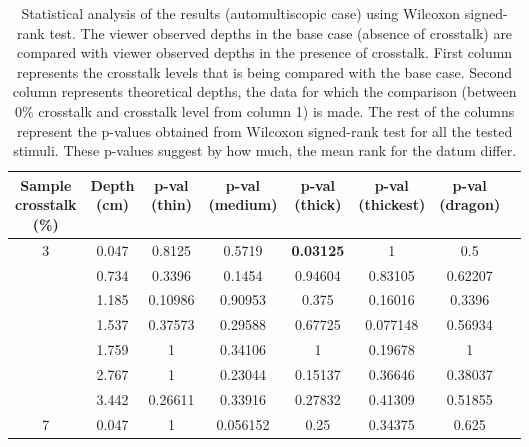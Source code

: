 \begin{table}[H]
  \begin{center}
    \caption{Statistical analysis of the results (automultiscopic case) using Wilcoxon signed-rank test. The viewer observed depths in the base case (absence of crosstalk) are compared with viewer observed depths in the presence of crosstalk. First column  represents the crosstalk levels that is being compared with the base case. Second column represents theoretical depths, the data for which the comparison (between 0\% crosstalk and crosstalk level from column 1) is made. The rest of the columns represent the p-values obtained from Wilcoxon signed-rank test for all the tested stimuli. These p-values suggest by how much, the mean rank for the datum differ.}
    \label{tab:posthoc_auto}
    \begin{tabular}{cccccccc}
      \toprule
      \specialcell{Sample\\crosstalk\\(\%)} & \specialcell{Depth \\(cm)} & \specialcell{p-val \\(thin)} & \specialcell{p-val \\(medium)} & \specialcell{p-val \\(thick)} & \specialcell{p-val \\(thickest)} & \specialcell{p-val \\(dragon)}\\
      \midrule
   3&          0.047&          0.8125&          0.5719&          \textbf{0.03125}&          1&          0.5 \\
    &          0.734&          0.3396&          0.1454&          0.94604&          0.83105&          0.62207 \\
    &          1.185&          0.10986&          0.90953&          0.375&          0.16016&          0.3396 \\
    &          1.537&          0.37573&          0.29588&          0.67725&          0.077148&          0.56934 \\
    &          1.759&          1    &          0.34106&          1&          0.19678&          1 \\
    &          2.767&          1    &          0.23044&          0.15137&          0.36646&          0.38037 \\
    &          3.442&          0.26611&          0.33916&          0.27832&          0.41309&          0.51855 \\
   7&          0.047&          1      &          0.056152&          0.25&          0.34375&          0.625 \\

\end{tabular}
\end{center}
\end{table}
